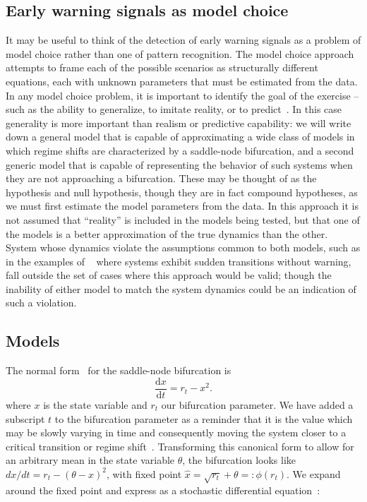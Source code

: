 \documentclass[authoryear,review,11pt]{elsarticle}
\newcommand{\ud}{\mathrm{d}}
\begin{document}
\subsection*{Early warning signals as model choice}
It may be useful to think of the detection of early warning signals
as a problem of model choice rather than one of pattern recognition.
The model choice approach attempts to frame each of the possible scenarios as structurally different equations,
each with unknown parameters that must be estimated from the data.
In any model choice problem, it is important to identify the goal of the exercise --
such as the ability to generalize, to imitate reality, or to predict~\citep{Levins1966}.
In this case generality is more important than realism or predictive capability:
we will write down a general model that is capable of approximating
a wide class of models in which regime shifts are characterized by a saddle-node bifurcation,
and a second generic model that is capable of representing the behavior of such systems
when they are not approaching a bifurcation.
These may be thought of as the hypothesis and null hypothesis,
though they are in fact compound hypotheses,
as we must first estimate the model parameters from the data.
In this approach it is not assumed that ``reality'' is included in the models being tested,
but that one of the models is a better approximation of the true dynamics than the other.
System whose dynamics violate the assumptions common to both models,
such as in the examples of ~\citet{Hastings2010} where systems exhibit sudden transitions without warning,
fall outside the set of cases where this approach would be valid;
though the inability of either model to match the system dynamics could be an indication of such a violation.


\subsection*{Models}
The normal form~\citep{Guckenheimer1983, Kuehn2011} for the saddle-node bifurcation is
\begin{equation}
\frac{\ud x}{\ud t} = r_t- x^2.
\label{saddle-node}
\end{equation}
where $x$ is the state variable and $r_t$ our bifurcation parameter.
We have added a subscript $t$ to the bifurcation parameter as a reminder that
it is the value which may be slowly varying in time and
consequently moving the system closer to a critical transition or regime shift~\citep{Scheffer2009}.
Transforming this canonical form to allow for an arbitrary mean in the state variable $\theta$,
the bifurcation looks like \( dx/dt = r_t- (\theta-x)^2 \), with fixed point \(\hat x = \sqrt{r_t} +\theta =: \phi(r_t)\).
We expand around the fixed point and express as a stochastic differential equation~\citep[\emph{e.g.}][]{Gardiner2009}:
\end{document}
